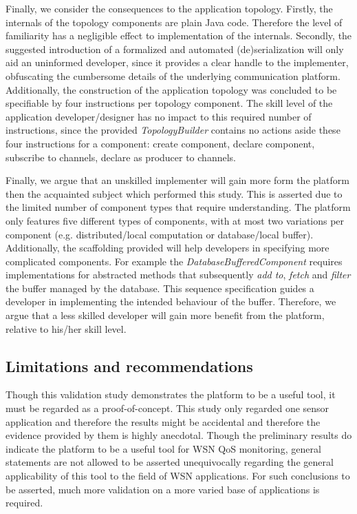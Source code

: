Finally, we consider the consequences to the application topology. Firstly, the internals of the topology components are plain Java code. Therefore the level of familiarity has a negligible effect to implementation of the internals. Secondly, the suggested introduction of a formalized and automated (de)serialization will only aid an uninformed developer, since it provides a clear handle to the implementer, obfuscating the cumbersome details of the underlying communication platform. Additionally, the construction of the application topology was concluded to be specifiable by four instructions per topology component. The skill level of the application developer/designer has no impact to this required number of instructions, since the provided \emph{TopologyBuilder} contains no actions aside these four instructions for a component: create component, declare component, subscribe to channels, declare as producer to channels. 

Finally, we argue that an unskilled implementer will gain more form the platform then the acquainted subject which performed this study. This is asserted due to the limited number of component types that require understanding. The platform only features five different types of components, with at most two variations per component (e.g. distributed/local computation or database/local buffer). Additionally, the scaffolding provided will help developers in specifying more complicated components. For example the \emph{DatabaseBufferedComponent} requires implementations for abstracted methods that subsequently \emph{add to}, \emph{fetch} and \emph{filter} the buffer managed by the database. This sequence specification guides a developer in implementing the intended behaviour of the buffer. Therefore, we argue that a less skilled developer will gain more benefit from the platform, relative to his/her skill level.

\subsection{Limitations and recommendations}
Though this validation study demonstrates the platform to be a useful tool, it must be regarded as a proof-of-concept. This study only regarded one sensor application and therefore the results might be accidental and therefore the evidence provided by them is highly anecdotal. Though the preliminary results do indicate the platform to be a useful tool for WSN QoS monitoring, general statements are not allowed to be asserted unequivocally regarding the general applicability of this tool to the field of WSN applications. For such conclusions to be asserted, much more validation on a more varied base of applications is required.

